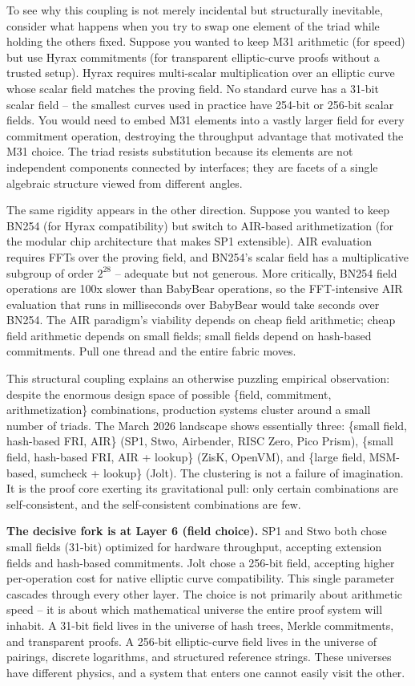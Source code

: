 \documentclass[
  11pt,
  openany]{report}
\renewcommand{\textbf}[1]{{\bfseries\color{MidnightBold}#1}}
\begin{document}
To see why this coupling is not merely incidental but structurally inevitable,
consider what happens when you try to swap one element of the triad while
holding the others fixed. Suppose you wanted to keep M31 arithmetic (for speed)
but use Hyrax commitments (for transparent elliptic-curve proofs without a
trusted setup). Hyrax requires multi-scalar multiplication over an elliptic
curve whose scalar field matches the proving field. No standard curve has a
31-bit scalar field -- the smallest curves used in practice have 254-bit or
256-bit scalar fields. You would need to embed M31 elements into a vastly larger
field for every commitment operation, destroying the throughput advantage that
motivated the M31 choice. The triad resists substitution because its elements
are not independent components connected by interfaces; they are facets of a
single algebraic structure viewed from different angles.

The same rigidity appears in the other direction. Suppose you wanted to keep
BN254 (for Hyrax compatibility) but switch to AIR-based arithmetization (for the
modular chip architecture that makes SP1 extensible). AIR evaluation requires
FFTs over the proving field, and BN254's scalar field has a multiplicative
subgroup of order \(2^{28}\) -- adequate but not generous. More critically,
BN254 field operations are 100x slower than BabyBear operations, so the
FFT-intensive AIR evaluation that runs in milliseconds over BabyBear would take
seconds over BN254. The AIR paradigm's viability depends on cheap field
arithmetic; cheap field arithmetic depends on small fields; small fields depend
on hash-based commitments. Pull one thread and the entire fabric moves.

This structural coupling explains an otherwise puzzling empirical observation:
despite the enormous design space of possible \{field, commitment,
arithmetization\} combinations, production systems cluster around a small number
of triads. The March 2026 landscape shows essentially three: \{small field,
hash-based FRI, AIR\} (SP1, Stwo, Airbender, RISC Zero, Pico Prism), \{small
field, hash-based FRI, AIR + lookup\} (ZisK, OpenVM), and \{large field,
MSM-based, sumcheck + lookup\} (Jolt). The clustering is not a failure of
imagination. It is the proof core exerting its gravitational pull: only certain
combinations are self-consistent, and the self-consistent combinations are few.

\textbf{The decisive fork is at Layer 6 (field choice).} SP1 and Stwo both chose
small fields (31-bit) optimized for hardware throughput, accepting extension
fields and hash-based commitments. Jolt chose a 256-bit field, accepting higher
per-operation cost for native elliptic curve compatibility. This single
parameter cascades through every other layer. The choice is not primarily about
arithmetic speed -- it is about which mathematical universe the entire proof
system will inhabit. A 31-bit field lives in the universe of hash trees, Merkle
commitments, and transparent proofs. A 256-bit elliptic-curve field lives in the
universe of pairings, discrete logarithms, and structured reference strings.
These universes have different physics, and a system that enters one cannot
easily visit the other.
\end{document}
